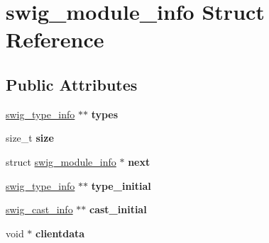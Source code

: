 \hypertarget{structswig__module__info}{
\section{swig\_\-module\_\-info Struct Reference}
\label{d8/d1b/structswig__module__info}
}
\subsection*{Public Attributes}
\begin{DoxyCompactItemize}
\item 
\hypertarget{structswig__module__info_a0a70e9ae189c2a26c92adbf2fabcd549}{
\hyperlink{structswig__type__info}{swig\_\-type\_\-info} $\ast$$\ast$ {\bfseries types}}
\label{d8/d1b/structswig__module__info_a0a70e9ae189c2a26c92adbf2fabcd549}

\item 
\hypertarget{structswig__module__info_aaf8907cf8509ee0464af8c9dfd909042}{
size\_\-t {\bfseries size}}
\label{d8/d1b/structswig__module__info_aaf8907cf8509ee0464af8c9dfd909042}

\item 
\hypertarget{structswig__module__info_adc59649870cda1ab12f45e57de99e572}{
struct \hyperlink{structswig__module__info}{swig\_\-module\_\-info} $\ast$ {\bfseries next}}
\label{d8/d1b/structswig__module__info_adc59649870cda1ab12f45e57de99e572}

\item 
\hypertarget{structswig__module__info_aaf36c0bb2e9e796ff1576359d52507c9}{
\hyperlink{structswig__type__info}{swig\_\-type\_\-info} $\ast$$\ast$ {\bfseries type\_\-initial}}
\label{d8/d1b/structswig__module__info_aaf36c0bb2e9e796ff1576359d52507c9}

\item 
\hypertarget{structswig__module__info_a14e4f7b0c9e0ff10543475c269b83507}{
\hyperlink{structswig__cast__info}{swig\_\-cast\_\-info} $\ast$$\ast$ {\bfseries cast\_\-initial}}
\label{d8/d1b/structswig__module__info_a14e4f7b0c9e0ff10543475c269b83507}

\item 
\hypertarget{structswig__module__info_a39999692b76f191b66a5ce746681dc84}{
void $\ast$ {\bfseries clientdata}}
\label{d8/d1b/structswig__module__info_a39999692b76f191b66a5ce746681dc84}

\end{DoxyCompactItemize}



